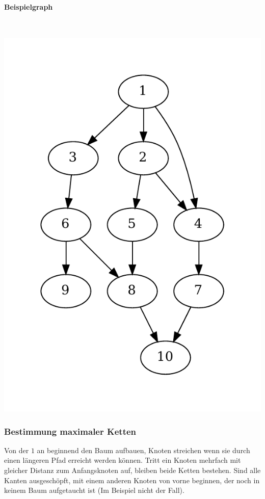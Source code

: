 \paragraph{Beispielgraph}~\\
\begin{center}
\includegraphics[scale=0.7]{images/BeispielgraphGraphentheorie.pdf}
\end{center}


\subsubsection{Bestimmung maximaler Ketten}
Von der $1$ an beginnend den Baum aufbauen, Knoten streichen wenn sie durch einen längeren
Pfad erreicht werden können. Tritt ein Knoten mehrfach mit gleicher Distanz zum Anfangsknoten
auf, bleiben beide Ketten bestehen. Sind alle Kanten ausgeschöpft, mit einem anderen Knoten von
vorne beginnen, der noch in keinem Baum aufgetaucht ist (Im Beispiel nicht der Fall).

